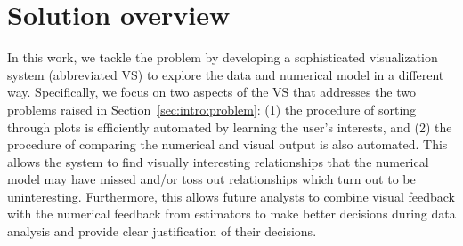 \section{Solution overview}
\label{sec:intro:solution}

In this work, we tackle the problem by developing a sophisticated visualization system (abbreviated VS) to explore the data and numerical model in a different way. Specifically, we focus on two aspects of the VS that addresses the two problems raised in Section~\ref{sec:intro:problem}: (1) the procedure of sorting through plots is efficiently automated by learning the user's interests, and (2) the procedure of comparing the numerical and visual output is also automated. This allows the system to find visually interesting relationships that the numerical model may have missed and/or toss out relationships which turn out to be uninteresting. Furthermore, this allows future analysts to combine visual feedback with the numerical feedback from estimators to make better decisions during data analysis and provide clear justification of their decisions.